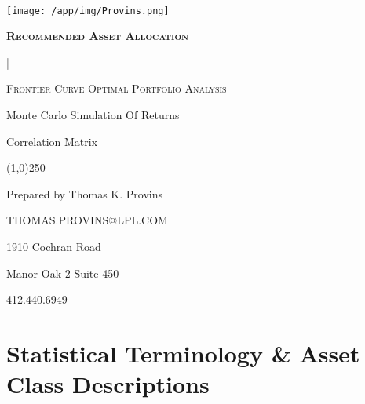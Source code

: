 \documentclass{article}
\begin{document}
\begin{titlepage}   %

\begin{center}
	{\scshape\Large\bfseries \, \par}
	\vspace{5cm}


	\texttt{[image: /app/img/Provins.png]}\par



	\vspace{0,5cm}
	{\scshape\Large\bfseries Recommended Asset Allocation

	{} | {} \par}
	\vspace{0,5cm}
	{\scshape\normalsize Frontier Curve Optimal Portfolio Analysis

	Monte Carlo Simulation Of Returns

	Correlation Matrix \par}
\end{center}

	\begin{center}
\line(1,0){250}
\end{center}

	\begin{center}
	 	{
		\small{
		Prepared by Thomas K. Provins

		THOMAS.PROVINS@LPL.COM}
		\par}


	\vfill
\end{center}

	\vfill

	{\begin{center}

	     1910 Cochran Road

	     Manor Oak 2 Suite 450

	     412.440.6949

	\end{center}}

\end{titlepage}


\tableofcontents    %

\begin{center}
\vfill
\vfill

\end{center}
\justify

\newpage    %

\section{Statistical Terminology \& Asset Class Descriptions}
\end{document}
